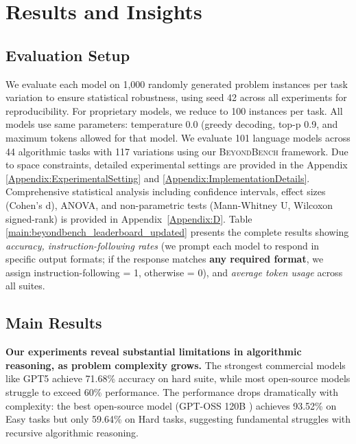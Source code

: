 \documentclass{article} %
\theoremstyle{plain}
\theoremstyle{definition}
\newcommand{\our}{\textsc{BeyondBench}\xspace}
\newcommand{\rebuttal}[1]{{\color{RebuttalGreen}#1}}
\begin{document}

\vspace{-0.5em}
\section{Results and Insights}

\subsection{Evaluation Setup}

We evaluate each model on 1,000 randomly generated problem instances per task variation to ensure statistical robustness, using seed 42 across all experiments for reproducibility. For proprietary models, we reduce to 100 instances per task. All models use same parameters: temperature 0.0 (greedy decoding, top-p 0.9, and maximum tokens allowed for that model. We evaluate 101 language models across 44 algorithmic tasks with 117 variations using our \our framework. Due to space constraints, detailed experimental settings are provided in the Appendix \ref{Appendix:ExperimentalSetting} and \ref{Appendix:ImplementationDetails}. \rebuttal{Comprehensive statistical analysis including confidence intervals, effect sizes (Cohen's d), ANOVA, and non-parametric tests (Mann-Whitney U, Wilcoxon signed-rank) is provided in Appendix~\ref{Appendix:D}.} Table \ref{main:beyondbench_leaderboard_updated} presents the complete results showing \textit{accuracy, instruction-following rates} (we prompt each model to respond in specific output formats; if the response matches \textbf{any required format}, we assign instruction-following = 1, otherwise = 0), and \textit{average token usage} across all suites.




\subsection{Main Results}





\textbf{Our experiments reveal substantial limitations in algorithmic reasoning, as problem complexity grows.} The strongest commercial models like GPT5 \citep{georgiou2025capabilitiesgpt5criticaldomains} achieve 71.68\% accuracy on hard suite, while most open-source models struggle to exceed 60\% performance. The performance drops dramatically with complexity: the best open-source model (GPT-OSS 120B \citep{openai2025gptoss120bgptoss20bmodel}) achieves 93.52\% on Easy tasks but only 59.64\% on Hard tasks, suggesting fundamental struggles with recursive algorithmic reasoning. 
\end{document}
